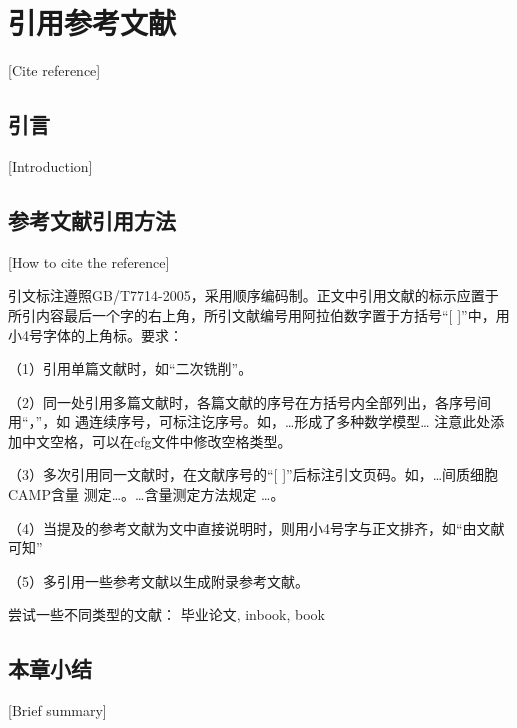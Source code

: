 
\chapter{引用参考文献}[Cite reference]

\section{引言}[Introduction]

\lipsum[1]

\section{参考文献引用方法}[How to cite the reference]

引文标注遵照GB/T7714-2005，采用顺序编码制。正文中引用文献的标示应置于所引内容最后一个字的右上角，所引文献编号用阿拉伯数字置于方括号“[ ]”中，用小4号字体的上角标。要求：

（1）引用单篇文献时，如“二次铣削\cite{ren2010}”。

（2）同一处引用多篇文献时，各篇文献的序号在方括号内全部列出，各序号间用“，”，如
遇连续序号，可标注讫序号。如，…形成了多种数学模型\cite{Gravagne2003,ren2010}…
注意此处添加中文空格，可以在cfg文件中修改空格类型。

（3）多次引用同一文献时，在文献序号的“[ ]”后标注引文页码。如，…间质细胞CAMP含量
测定\cite[100-197]{Gravagne2003}…。…含量测定方法规定
\cite[92]{Gravagne2003}…。

（4）当提及的参考文献为文中直接说明时，则用小4号字与正文排齐，如“由文献可知”

（5）多\cite{liu2016}引\cite{fu2018}用\cite{zhai2015}一\cite{yao2015}些\cite{jones2006}参\cite{mcmahan2005}考\cite{jones2004}文献以生成附录参考文献。

尝试一些不同类型的文献： 毕业论文\cite{liu2016}, inbook\cite{Lin1992}, book\cite{xin1994}

\section{本章小结}[Brief summary]

\lipsum[1]
